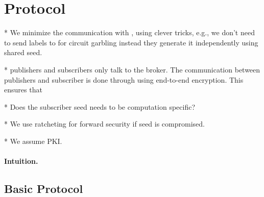 \section{Protocol}
\label{sec:protocol}

* We minimize the communication with \garbler, using clever tricks, e.g.,
we don't need to send labels to \garbler for circuit garbling instead they
generate it independently using shared seed.

* publishers and subscribers only talk to the broker. The communication
between publishers and subscriber is done through \broker using end-to-end
encryption. This ensures that 

* Does the subscriber seed needs to be computation specific?

* We use ratcheting for forward security if seed is compromised.

* We assume PKI.

\paragraph{Intuition.}

\subsection{Basic Protocol}

